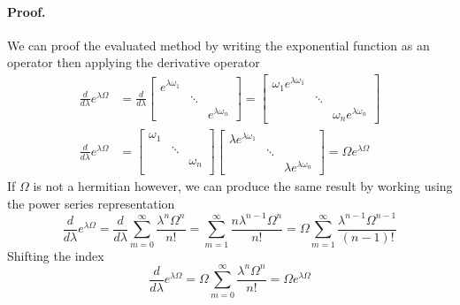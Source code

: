 \documentclass[../../../main.tex]{subfiles}
\begin{document}
\paragraph*{Proof.} We can proof the evaluated method by writing the exponential function as an operator then applying the derivative operator
\begin{align*}
	\frac{d }{d\lambda}e^{\lambda\Omega}  & =\frac{d }{d\lambda}
	\begin{bmatrix}
		e^{\lambda\omega_1} &        &                     \\
		                    & \ddots &                     \\
		                    &        & e^{\lambda\omega_n}
	\end{bmatrix}
	=
	\begin{bmatrix}
		\omega_1 e^{\lambda\omega_1} &        &                              \\
		                             & \ddots &                              \\
		                             &        & \omega_n e^{\lambda\omega_n}
	\end{bmatrix} \\
	\frac{d }{d\lambda }e^{\lambda\Omega} & =
	\begin{bmatrix}
		\omega_1 &        &          \\
		         & \ddots &          \\
		         &        & \omega_n \\
	\end{bmatrix}
	\begin{bmatrix}
		\lambda e^{\lambda\omega_1} &        &                             \\
		                            & \ddots &                             \\
		                            &        & \lambda e^{\lambda\omega_n}
	\end{bmatrix}
	=\Omega e^{\lambda \Omega}
\end{align*}
If $\Omega$ is not a hermitian however, we can produce the same result by working using the power series representation
\begin{equation*}
	\frac{d }{d\lambda }e^{\lambda\Omega}=\frac{d }{d\lambda} \sum_{m=0 }^{\infty }\frac{\lambda^n\Omega^n }{n! }= \sum_{m=1 }^{\infty }\frac{n\lambda^{n-1 }\Omega^{n}}{n!}=\Omega\sum_{m=1 }^{\infty}\frac{\lambda^{n-1} \Omega^{n-1}}{(n-1)!}
\end{equation*}
Shifting the index
\begin{equation*}
	\frac{d }{d\lambda }e^{\lambda \Omega}=\Omega\sum_{m=0 }^{\infty}\frac{\lambda^n \Omega^n }{n!}=\Omega e^{\lambda\Omega}
\end{equation*}
\end{document}
